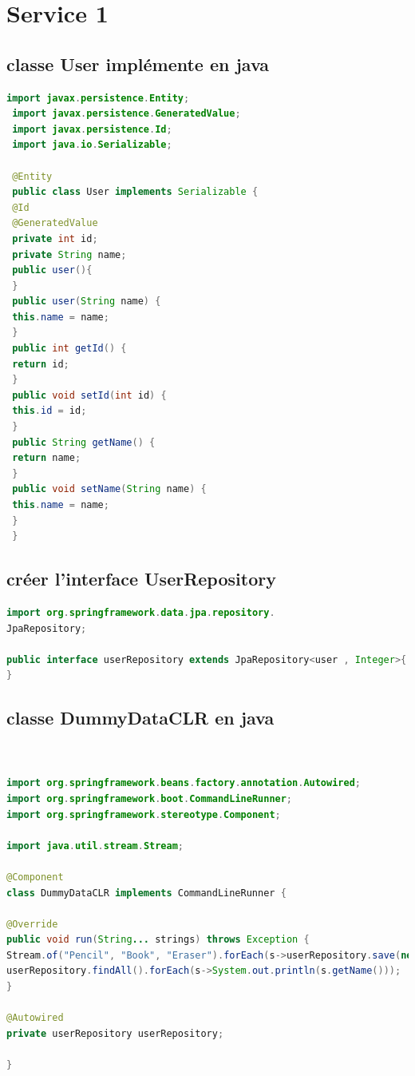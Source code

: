\chapter{Service 1}
\section{classe User implémente en java  }

\begin{lstlisting}[language=java]
 import javax.persistence.Entity;
 import javax.persistence.GeneratedValue;
 import javax.persistence.Id;
 import java.io.Serializable;
 
 @Entity
 public class User implements Serializable {
 @Id
 @GeneratedValue
 private int id;
 private String name;
 public user(){
 }
 public user(String name) {
 this.name = name;
 }
 public int getId() {
 return id;
 }
 public void setId(int id) {
 this.id = id;
 }
 public String getName() {
 return name;
 }
 public void setName(String name) {
 this.name = name;
 }
 }
\end{lstlisting}

\section{créer l'interface UserRepository}


\begin{lstlisting}[language=java]
import org.springframework.data.jpa.repository.
JpaRepository;

public interface userRepository extends JpaRepository<user , Integer>{ 
}
\end{lstlisting}


\section{classe DummyDataCLR en java }
\begin{lstlisting}[language=java]
 

import org.springframework.beans.factory.annotation.Autowired;
import org.springframework.boot.CommandLineRunner;
import org.springframework.stereotype.Component;

import java.util.stream.Stream;

@Component
class DummyDataCLR implements CommandLineRunner {

@Override
public void run(String... strings) throws Exception {
Stream.of("Pencil", "Book", "Eraser").forEach(s->userRepository.save(new user(s)));
userRepository.findAll().forEach(s->System.out.println(s.getName()));
}

@Autowired
private userRepository userRepository;

}
\end{lstlisting}

